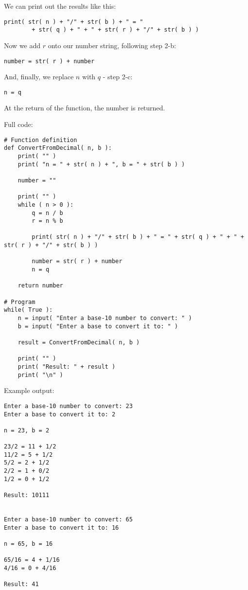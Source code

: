\documentclass[a4paper,12pt]{book}
\begin{document}
    We can print out the results like this:

\begin{verbatim}
print( str( n ) + "/" + str( b ) + " = "
        + str( q ) + " + " + str( r ) + "/" + str( b ) )
\end{verbatim}

    Now we add $r$ onto our number string, following step 2-b:

\begin{verbatim}
number = str( r ) + number
\end{verbatim}

    And, finally, we replace $n$ with $q$ - step 2-c:

\begin{verbatim}
n = q
\end{verbatim}

    At the return of the function, the number is returned.

    \newpage

    Full code:

\begin{lstlisting}[style=pycode]
# Function definition
def ConvertFromDecimal( n, b ):
    print( "" )
    print( "n = " + str( n ) + ", b = " + str( b ) )

    number = ""

    print( "" )
    while ( n > 0 ):
        q = n / b
        r = n % b

        print( str( n ) + "/" + str( b ) + " = " + str( q ) + " + " + str( r ) + "/" + str( b ) )

        number = str( r ) + number
        n = q

    return number

# Program
while( True ):
    n = input( "Enter a base-10 number to convert: " )
    b = input( "Enter a base to convert it to: " )

    result = ConvertFromDecimal( n, b )

    print( "" )
    print( "Result: " + result )
    print( "\n" )
\end{lstlisting}

    \newpage

    Example output:

\begin{lstlisting}[style=output]
Enter a base-10 number to convert: 23
Enter a base to convert it to: 2

n = 23, b = 2

23/2 = 11 + 1/2
11/2 = 5 + 1/2
5/2 = 2 + 1/2
2/2 = 1 + 0/2
1/2 = 0 + 1/2

Result: 10111


Enter a base-10 number to convert: 65
Enter a base to convert it to: 16

n = 65, b = 16

65/16 = 4 + 1/16
4/16 = 0 + 4/16

Result: 41
\end{lstlisting}
    
\end{document}
